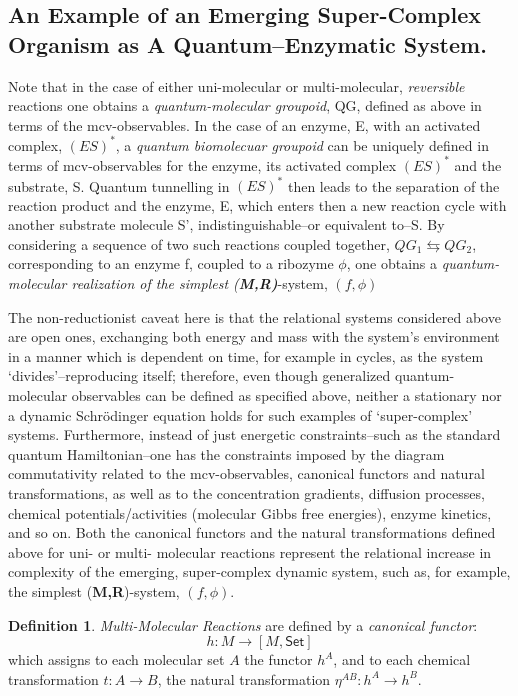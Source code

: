 \documentclass[12pt]{article}
\theoremstyle{plain}
\theoremstyle{definition}
\newtheorem{definition}{Definition}[section]
\theoremstyle{plain}
\numberwithin{equation}{section}
\newcommand{\med}{\medbreak}
\begin{document}
\subsection{An Example of an Emerging Super-Complex Organism as A Quantum--Enzymatic System.}

Note that in the case of either uni-molecular or multi-molecular, \emph{reversible} reactions one obtains a \emph{quantum-molecular groupoid}, QG, defined as above in terms of the mcv-observables.  In the case of an enzyme, E, with an activated complex, $(ES)^*$,
a \emph{quantum biomolecuar groupoid} can be uniquely defined in terms of mcv-observables for the enzyme, its activated complex $(ES)^*$ and the substrate, S.  Quantum tunnelling in $(ES)^*$ then leads to the separation of the reaction product and the enzyme, E, which enters then a new reaction cycle with another substrate molecule S', indistinguishable--or equivalent to--S. By considering a sequence of two such reactions coupled together,
\med
$QG_1 \leftrightarrows QG_2$,
\med
corresponding to an enzyme f, coupled to a ribozyme $\phi$, one obtains a \emph{quantum-molecular realization of the simplest (\textbf{M,R)}}-system,  $(f, \phi)$  
\med
\noindent

  The non-reductionist caveat here is that the relational systems considered above
are open ones, exchanging both energy and mass with the system's environment in a manner
which is dependent on time, for example in cycles, as the system `divides'--reproducing itself; therefore, even though generalized quantum-molecular observables can be defined
as specified above, neither a stationary nor a dynamic Schr\"{o}dinger equation holds
for such examples of `super-complex' systems. Furthermore, instead of just energetic constraints--such as the standard quantum Hamiltonian--one has the constraints imposed
by the diagram commutativity related to the mcv-observables, canonical functors and
natural transformations, as well as to the concentration gradients, diffusion processes,
chemical potentials/activities (molecular Gibbs free energies), enzyme kinetics, and so on.   Both the canonical functors and the natural transformations defined above for uni- or
multi- molecular reactions represent the relational increase in complexity of the emerging,
super-complex dynamic system, such as, for example, the simplest (\textbf{M,R})-system,
$(f, \phi)$.
\med
\begin{definition} \emph{Multi-Molecular Reactions} are defined by a \emph{canonical functor}:
 $$h: M \longrightarrow  [M, \mathsf{Set}]$$ which assigns to each molecular set $A$ 
the functor $h^A$, and to each chemical transformation $t: A \longrightarrow B$, the natural transformation $\eta^{AB}: h^A\longrightarrow h^B$.
\end{definition}
\end{document}

